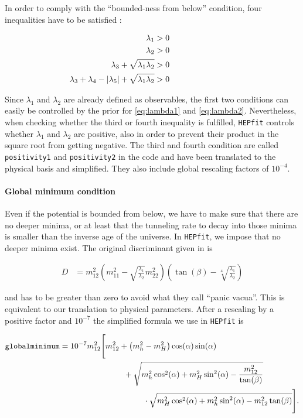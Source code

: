 \documentclass[preprint,3p,12pt]{elsarticle}
\newcommand{\HEPfit}{\texttt{HEPfit}\xspace}
\begin{document}
{In order to comply with the ``bounded-ness from below'' condition, four inequalities have to be satisfied \cite{Deshpande:1977rw}:

\begin{align}
 \lambda_1&>0 \hspace*{80pt}\nonumber\\
 \lambda_2&>0 \nonumber\\
 \lambda_3 + \sqrt{\lambda_1 \lambda_2} &>0 \nonumber\\
 \lambda_3 + \lambda_4 - |\lambda_5| + \sqrt{\lambda_1 \lambda_2}&>0 \nonumber
\end{align}

Since $\lambda_1$ and $\lambda_2$ are already defined as observables, the first two conditions can easily be controlled by the prior for \eqref{eq:lambda1} and \eqref{eq:lambda2}. Nevertheless, when checking whether the third or fourth inequality is fulfilled, \HEPfit controls whether $\lambda_1$ and $\lambda_2$ are positive, also in order to prevent their product in the square root from getting negative. The third and fourth condition are called {\tt positivity1} and {\tt positivity2} in the code and have been translated to the physical basis and simplified. They also include global rescaling factors of $10^{-4}$.\\

\paragraph{Global minimum condition}

Even if the potential is bounded from below, we have to make sure that there are no deeper minima, or at least that the tunneling rate to decay into those minima is smaller than the inverse age of the universe. In \HEPfit, we impose that no deeper minima exist.
The original discriminant given in \cite{Barroso:2013awa} is

\begin{align}
 D&=m_{12}^2 \left( m_{11}^2 - \sqrt{\frac{\lambda_1}{\lambda_2}}m_{22}^2 \right) \left( \tan(\beta ) -\sqrt[4]{\frac{\lambda_1}{\lambda_2}}\right) \nonumber
\end{align}

and has to be greater than zero to avoid what they call ``panic vacua''. This is equivalent to our translation to physical parameters. After a rescaling by a positive factor and $10^{-7}$ the simplified formula we use in \HEPfit is

\begin{align}
 \tt{globalminimum} &= 10^{-7} m_{12}^2 \Bigg[ m_{12}^2 + \left( m_h^2 - m_H^2 \right) \cos (\alpha) \sin (\alpha) \phantom{Bigg]} \nonumber \\
 & \hspace*{80pt} +\sqrt{ m_h^2 \cos^2(\alpha) +m_H^2 \sin^2(\alpha) - \frac{m_{12}^2}{\tan(\beta)} } \nonumber \\
 & \hspace*{80pt} \phantom{Bigg[} \cdot \sqrt{ m_H^2 \cos^2(\alpha) +m_h^2 \sin^2(\alpha) -m_{12}^2 \tan (\beta ) } \Bigg] .\nonumber
\end{align}

}
\end{document}
